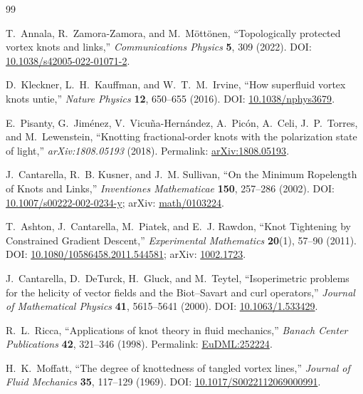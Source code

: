 \ifresearchtrackincluded\else
\begin{thebibliography}{99}

T.~Annala, R.~Zamora-Zamora, and M.~M{\"o}tt{\"o}nen,
``Topologically protected vortex knots and links,''
\emph{Communications Physics} \textbf{5}, 309 (2022).
DOI: \href{https://doi.org/10.1038/s42005-022-01071-2}{10.1038/s42005-022-01071-2}.

D.~Kleckner, L.~H.~Kauffman, and W.~T.~M.~Irvine,
``How superfluid vortex knots untie,''
\emph{Nature Physics} \textbf{12}, 650--655 (2016).
DOI: \href{https://doi.org/10.1038/nphys3679}{10.1038/nphys3679}.

E.~Pisanty, G.~Jim{\'e}nez, V.~Vicu{\~n}a-Hern{\'a}ndez, A.~Pic{\'o}n, A.~Celi, J.~P.~Torres, and M.~Lewenstein,
``Knotting fractional-order knots with the polarization state of light,''
\emph{arXiv:1808.05193} (2018).
Permalink: \href{https://arxiv.org/abs/1808.05193}{arXiv:1808.05193}.

J.~Cantarella, R.~B. Kusner, and J.~M. Sullivan,
``On the Minimum Ropelength of Knots and Links,''
\emph{Inventiones Mathematicae} \textbf{150}, 257--286 (2002).
DOI: \href{https://doi.org/10.1007/s00222-002-0234-y}{10.1007/s00222-002-0234-y};
arXiv: \href{https://arxiv.org/abs/math/0103224}{math/0103224}.

T.~Ashton, J.~Cantarella, M.~Piatek, and E.~J. Rawdon,
``Knot Tightening by Constrained Gradient Descent,''
\emph{Experimental Mathematics} \textbf{20}(1), 57--90 (2011).
DOI: \href{https://doi.org/10.1080/10586458.2011.544581}{10.1080/10586458.2011.544581};
arXiv: \href{https://arxiv.org/abs/1002.1723}{1002.1723}.

J.~Cantarella, D.~DeTurck, H.~Gluck, and M.~Teytel,
``Isoperimetric problems for the helicity of vector fields and the Biot--Savart and curl operators,''
\emph{Journal of Mathematical Physics} \textbf{41}, 5615--5641 (2000).
DOI: \href{https://doi.org/10.1063/1.533429}{10.1063/1.533429}.


R.~L.~Ricca,
``Applications of knot theory in fluid mechanics,''
\emph{Banach Center Publications} \textbf{42}, 321--346 (1998).
Permalink: \href{https://eudml.org/doc/252224}{EuDML:252224}.

H.~K.~Moffatt,
``The degree of knottedness of tangled vortex lines,''
\emph{Journal of Fluid Mechanics} \textbf{35}, 117--129 (1969).
DOI: \href{https://doi.org/10.1017/S0022112069000991}{10.1017/S0022112069000991}.


\end{thebibliography}
